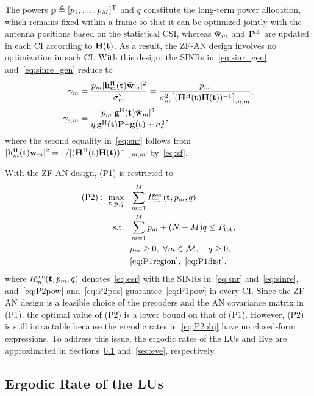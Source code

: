 \documentclass[journal]{IEEEtran}
\begin{document}
The powers $\mathbf{p}\triangleq[p_1,\ldots,p_M]^{\mathrm T}$ and $q$ constitute the long-term power allocation, which remains fixed within a frame so that it can be optimized jointly with the antenna positions based on the statistical CSI, whereas $\bar{\mathbf{w}}_m$ and $\mathbf{P}^{\perp}$ are updated in each CI according to $\mathbf{H}(\mathbf{t})$. As a result, the ZF-AN design involves no optimization in each CI. With this design, the SINRs in~\eqref{eq:sinr_gen} and~\eqref{eq:sinre_gen} reduce to
\begin{align}
\gamma_m&=\frac{p_m|\mathbf{h}_m^{\mathrm H}(\mathbf{t})\bar{\mathbf{w}}_m|^2}{\sigma_m^2}=\frac{p_m}{\sigma_m^2\big[(\mathbf{H}^{\mathrm H}(\mathbf{t})\mathbf{H}(\mathbf{t}))^{-1}\big]_{m,m}},\label{eq:snr}\\
\gamma_{\mathrm{e},m}&=\frac{p_m|\mathbf{g}^{\mathrm H}(\mathbf{t})\bar{\mathbf{w}}_m|^2}{q\,\mathbf{g}^{\mathrm H}(\mathbf{t})\mathbf{P}^{\perp}\mathbf{g}(\mathbf{t})+\sigma_{\mathrm e}^2},\label{eq:sinre}
\end{align}
where the second equality in~\eqref{eq:snr} follows from $|\mathbf{h}_m^{\mathrm H}(\mathbf{t})\bar{\mathbf{w}}_m|^2=1/[(\mathbf{H}^{\mathrm H}(\mathbf{t})\mathbf{H}(\mathbf{t}))^{-1}]_{m,m}$ by~\eqref{eq:zf}.

With the ZF-AN design, (P1) is restricted to
\begin{subequations}\label{eq:P2}
\begin{align}
(\mathrm{P2}):\ \max_{\mathbf{t},\mathbf{p},q}\ \ & \sum_{m=1}^{M}R_m^{\mathrm{sec}}(\mathbf{t},p_m,q)\label{eq:P2obj}\\
\mathrm{s.t.}\ \ & \sum_{m=1}^{M}p_m+(N-M)q\le P_{\mathrm{tot}},\label{eq:P2pow}\\
& p_m\ge0,\ \forall m\in\mathcal M,\quad q\ge0,\label{eq:P2pos}\\
& \eqref{eq:P1region},\ \eqref{eq:P1dist},\nonumber
\end{align}
\end{subequations}
where $R_m^{\mathrm{sec}}(\mathbf{t},p_m,q)$ denotes~\eqref{eq:esr} with the SINRs in~\eqref{eq:snr} and~\eqref{eq:sinre}, and~\eqref{eq:P2pow} and~\eqref{eq:P2pos} guarantee~\eqref{eq:P1pow} in every CI. Since the ZF-AN design is a feasible choice of the precoders and the AN covariance matrix in (P1), the optimal value of (P2) is a lower bound on that of (P1). However, (P2) is still intractable because the ergodic rates in~\eqref{eq:P2obj} have no closed-form expressions. To address this issue, the ergodic rates of the LUs and Eve are approximated in Sections~\ref{sec:lu} and~\ref{sec:eve}, respectively.

\subsection{Ergodic Rate of the LUs}\label{sec:lu}
\end{document}
